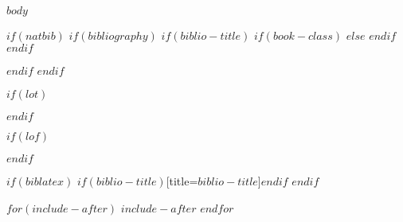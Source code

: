 \documentclass[$if(fontsize)$$fontsize$,$endif$$if(lang)$$babel-lang$,$endif$$if(papersize)$$papersize$paper,$endif$$for(classoption)$$classoption$$sep$,$endfor$]{$documentclass$}
\begin{document}
\pagestyle{fancy}
$body$
\newpage

$if(natbib)$
    $if(bibliography)$
        $if(biblio-title)$
            $if(book-class)$
                \renewcommand\bibname{$biblio-title$}
            $else$
                \renewcommand\refname{$biblio-title$}
            $endif$
        $endif$
        
        \newpage
    $endif$
$endif$

$if(lot)$
    \listoftables
    \newpage
$endif$

$if(lof)$
    \listoffigures
    \newpage
$endif$

$if(biblatex)$
    \printbibliography$if(biblio-title)$[title=$biblio-title$]$endif$
    \newpage
$endif$

$for(include-after)$
    $include-after$
    \newpage
$endfor$
\end{document}
